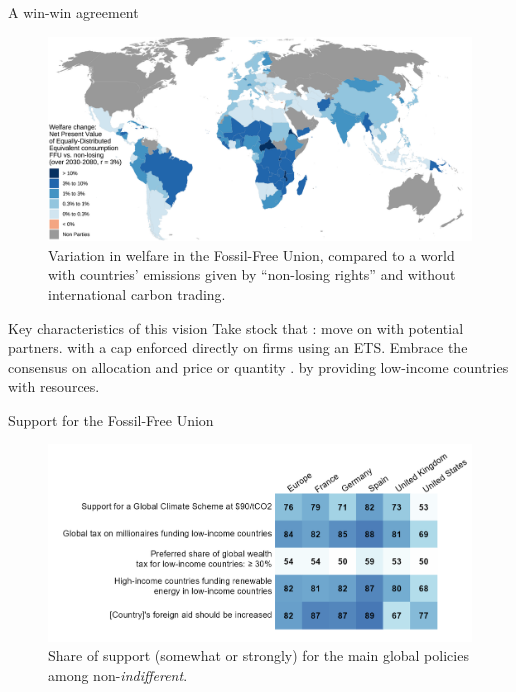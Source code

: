 \documentclass[aspectratio=169,xcolor=dvipsnames, 11pt,mathserif]{beamer}
\begin{document}
\begin{frame}{A win-win agreement}
\begin{figure}
  \caption{Variation in welfare in the Fossil-Free Union, compared to a world with countries' emissions given by ``non-losing rights'' and without international carbon trading.}
  \includegraphics[width=.88\textwidth]{../figures/maps/var_npv_ede_ffu_nl.pdf}
\end{figure}
\end{frame}

\begin{frame}{Key characteristics of this vision}
    \bbsp \ip Take stock that : move on with potential partners.
    \ip {} with a cap enforced directly on firms using an ETS.
    \ip Embrace the consensus on  allocation and  price or quantity .
    \ip {} by providing low-income countries with resources.%
    \ee
\end{frame}

\begin{frame}{Support for the Fossil-Free Union}
	\vspace{-.3cm}
	\begin{figure}[h!]
		\centering		
		\caption{Share of support (somewhat or strongly) for the main global policies among non-\textit{indifferent}.  
        }
        \vspace{-.2cm}
		\includegraphics[width=\textwidth]{../figures/country_comparison/few_main_share.png} %
		\end{figure} 
\end{frame}
\end{document}
